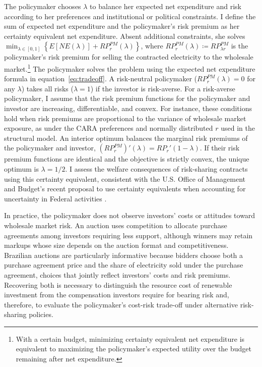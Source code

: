 \documentclass[12pt]{article}
\theoremstyle{definition} %
\begin{document}
The policymaker chooses $\lambda $ to balance her expected net expenditure and risk according to her preferences and institutional or political constraints. I define the sum of expected net expenditure and the policymaker's risk premium as her certainty equivalent net expenditure. Absent additional constraints, she solves $\min_{\lambda \in [0,1]} \left\{E[NE(\lambda)] + RP_r^{PM}(\lambda)\right\}$, where $RP_r^{PM}(\lambda) \coloneqq RP_{\lambda r}^{PM} $ is the policymaker's risk premium for selling the contracted electricity to the wholesale market.\footnote{
With a certain budget, minimizing certainty equivalent net expenditure is equivalent to maximizing the policymaker's expected utility over the budget remaining after net expenditure.
} The policymaker solves the problem using the expected net expenditure formula in equation~\eqref{eq:tradeoff}. A risk-neutral policymaker ($RP_r^{PM}(\lambda) = 0 $ for any $\lambda $) takes all risks ($\lambda = 1 $) if the investor is risk-averse. For a risk-averse policymaker, I assume that the risk premium functions for the policymaker and investor are increasing, differentiable, and convex. For instance, these conditions hold when risk premiums are proportional to the variance of wholesale market exposure, as under the CARA preferences and normally distributed \(r\) used in the structural model. An interior optimum balances the marginal risk premiums of the policymaker and investor, $(RP_r^{PM})'(\lambda) = RP_r'(1-\lambda) $. If their risk premium functions are identical and the objective is strictly convex, the unique optimum is $\lambda=1/2 $. I assess the welfare consequences of risk-sharing contracts using this certainty equivalent, consistent with the U.S. Office of Management and Budget's recent proposal to use certainty equivalents when accounting for uncertainty in Federal activities \citep{OMB2023}.


In practice, the policymaker does not observe investors' costs or attitudes toward wholesale market risk. An auction uses competition to allocate purchase agreements among investors requiring less support, although winners may retain markups whose size depends on the auction format and competitiveness. Brazilian auctions are particularly informative because bidders choose both a purchase agreement price and the share of electricity sold under the purchase agreement, choices that jointly reflect investors' costs and risk premiums. Recovering both is necessary to distinguish the resource cost of renewable investment from the compensation investors require for bearing risk and, therefore, to evaluate the policymaker's cost-risk trade-off under alternative risk-sharing policies.
\end{document}
